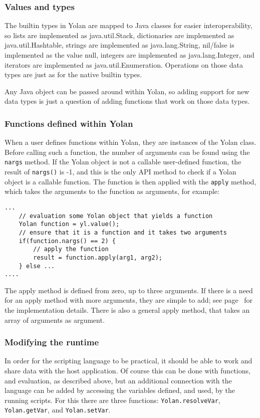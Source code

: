 \documentclass[11pt]{report}
\begin{document}
\subsubsection{Values and types}
The builtin types in Yolan are mapped to Java classes for easier interoperability,
so lists are implemented as java.util.Stack, dictionaries are implemented as java.util.Hashtable, strings are implemented as java.lang.String, nil/false is implemented as the value null, integers are implemented as java.lang.Integer, and iterators are implemented as java.util.Enumeration. 
Operations on those data types are just as for the native builtin types. 

Any Java object can be passed around within Yolan, so adding support for new data types is just a question of adding functions that work on those data types.

\subsubsection{Functions defined within Yolan}
When a user defines functions within Yolan, they are instances of the Yolan class. 
Before calling such a function, the number of arguments can be found using the \verb|nargs| method.
If the Yolan object is not a callable user-defined function, the result of \verb|nargs()| is -1, and this is the only API method to check if a Yolan object is a callable function.
The function is then applied with the \verb|apply| method, which takes the arguments to the function as arguments, for example:
\begin{lstlisting}
...
    // evaluation some Yolan object that yields a function
    Yolan function = yl.value();
    // ensure that it is a function and it takes two arguments
    if(function.nargs() == 2) {
        // apply the function 
        result = function.apply(arg1, arg2);
    } else ...
....
\end{lstlisting}
The apply method is defined from zero, up to three arguments. If there is a need for an apply method with more arguments, they are simple to add; see page~\pageref{source-yolan-apply} for the implementation details. There is also a general apply method, that takes an array of arguments as argument.

\subsubsection{Modifying the runtime}

In order for the scripting language to be practical, it should be able to work and share data with the host application. 
Of course this can be done with functions, and evaluation, as described above, but an additional connection with the language can be added by accessing the variables defined, and used, by the running scripts.
For this there are three functions: \verb|Yolan.resolveVar|, \verb|Yolan.getVar|, and \verb|Yolan.setVar|.
\end{document}
